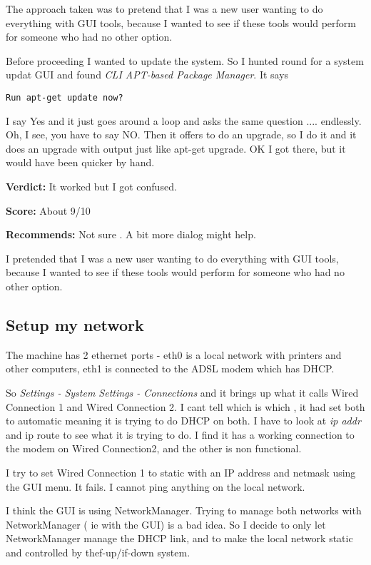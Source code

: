 \documentclass{article}  %
\begin{document}
The approach taken was to  pretend that I was a new user wanting to do everything with GUI tools, because I wanted to see if these tools would perform for someone who had no other option.

Before proceeding I wanted to update the system.  So I hunted round for a system updat GUI and found {\em CLI APT-based Package Manager}.   It says 
\begin{verbatim}
Run apt-get update now?
\end{verbatim}
I say Yes and it just goes around a loop and asks the same question .... endlessly. Oh, I see, you have to say NO. Then it offers to do an upgrade, so I do it and it does an upgrade with output just like apt-get upgrade.  OK I got there, but it would have been quicker by hand.

{\bf Verdict:} It worked but I got confused.

{\bf Score:} About 9/10

{\bf Recommends:}  Not sure . A bit more dialog might help.

I pretended that I was a new user wanting to do everything with GUI tools, because I wanted to see if these tools would perform for someone who had no other option.

\subsection{Setup my network}
The machine has 2 ethernet ports - eth0 is a local network with printers and other computers, eth1 is connected to the ADSL modem which has DHCP. 

So {\em Settings - System Settings - Connections} and it brings up what it calls Wired Connection 1  and Wired Connection 2.  I cant tell which is which , it had set both to automatic meaning it is trying to do DHCP on both.  I have to look at {\em ip addr} and {ip route} to see what it is trying to do. I find it has a working connection to the modem on Wired Connection2, and the other is non functional.

I try to set Wired Connection 1 to static with an IP address and netmask using the GUI menu. It fails.  I cannot ping anything on the local network.

I think the GUI is using NetworkManager. Trying to manage both networks with NetworkManager ( ie with the GUI) is a bad idea. So I decide to only let NetworkManager manage the DHCP link, and to make the local network static and controlled by thef-up/if-down system.
\end{document}
